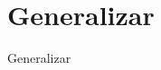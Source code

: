 \documentclass{beamer}
\begin{document}
\section{Generalizar}
\begin{frame}{Generalizar}
\end{frame}

%
%
%
%
%
\end{document}

